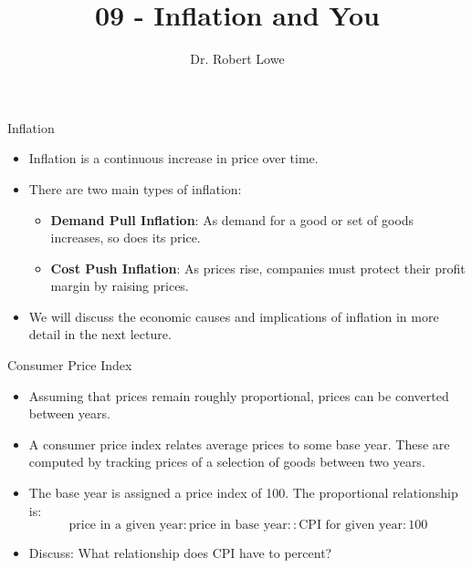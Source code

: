 \documentclass[]{beamer}
\title{09 - Inflation and You}
\author{Dr. Robert Lowe\\}
\institute[Maryville College] %
{
  Division of Mathematics and Computer Science\\
  Maryville College
}
\date[]{}
\begin{document}
\begin{frame}
  \titlepage
\end{frame}






\begin{frame}{Inflation}
\begin{itemize}[<+->]
\item Inflation is a continuous increase in price over time.
\item There are two main types of inflation:
    \begin{itemize}
    \item {\bf Demand Pull Inflation}: As demand for a good or set of goods increases, 
       so does its price.
    \item {\bf Cost Push Inflation}: As prices rise, companies must protect their profit
       margin by raising prices.
    \end{itemize}
\item We will discuss the economic causes and implications of inflation in more detail 
  in the next lecture.
\end{itemize}
\end{frame}

\begin{frame}{Consumer Price Index}
\begin{itemize}[<+->]
\item Assuming that prices remain roughly proportional, prices can be converted between years.
\item A consumer price index relates average prices to some base year.  These are computed by tracking prices of a selection of goods between two years.
\item The base year is assigned a price index of 100.  The proportional relationship is:
\[
\textrm{price in a given year} : \textrm{price in base year} :: \textrm{CPI for given year} : 100 
\]
\item Discuss:  What relationship does CPI have to percent?
\end{itemize}
\end{frame}
\end{document}
